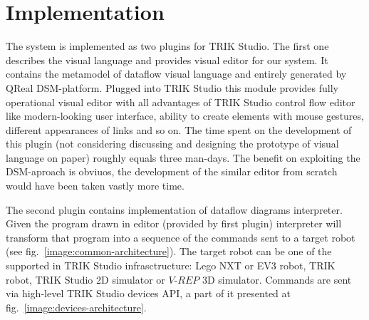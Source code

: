 \documentclass[conference,compsoc]{IEEEtran}
\begin{document}


\section{Implementation}
\label{sec:Implementation}
The system is implemented as two plugins for TRIK Studio. The first one describes the visual language and provides visual editor for our system. It contains the metamodel of dataflow visual language and entirely generated by QReal DSM-platform. Plugged into TRIK Studio this module provides fully operational visual editor with all advantages of TRIK Studio control flow editor like modern-looking user interface, ability to create elements with mouse gestures, different appearances of links and so on. The time spent on the development of this plugin (not considering discussing and designing the prototype of visual language on paper) roughly equals three man-days. The benefit on exploiting the DSM-aproach is obviuos, the development of the similar editor from scratch would have been taken vastly more time.

The second plugin contains implementation of dataflow diagrams interpreter. Given the program drawn in editor (provided by first plugin) interpreter will transform that program into a sequence of the commands sent to a target robot (see fig.~\ref{image:common-architecture}). The target robot can be one of the supported in TRIK Studio infrasctructure: Lego NXT or EV3 robot, TRIK robot, TRIK Studio 2D simulator or $V\mbox{-}REP$ 3D simulator\cite{rohmer2013v}. Commands are sent via high-level TRIK Studio devices API, a part of it presented at fig.~\ref{image:devices-architecture}.
\end{document}

